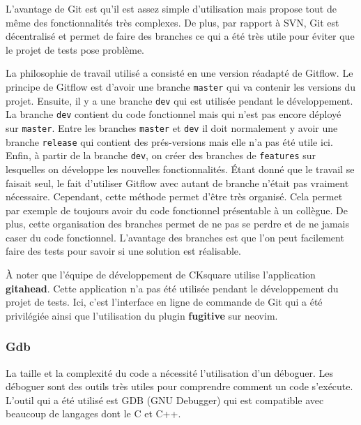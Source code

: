 \documentclass[a4paper]{article}
\begin{document}
L'avantage de Git est qu'il est assez simple d'utilisation mais propose tout de
même des fonctionnalités très complexes. De plus, par rapport à SVN, Git est
décentralisé et permet de faire des branches ce qui a été très utile pour éviter
que le projet de tests pose problème.

La philosophie de travail utilisé a consisté en une version réadapté de Gitflow.
Le principe de Gitflow est d'avoir une branche \verb|master| qui va
contenir les versions du projet. Ensuite, il y a une branche \verb|dev| qui
est utilisée pendant le développement. La branche \verb|dev| contient du
code fonctionnel mais qui n'est pas encore déployé sur \verb|master|. Entre
les branches \verb|master| et \verb|dev| il doit normalement y avoir
une branche \verb|release| qui contient des prés-versions mais elle n'a pas
été utile ici. Enfin, à partir de la branche \verb|dev|, on créer des
branches de \verb|features| sur lesquelles on développe les nouvelles
fonctionnalités. Étant donné que le travail se faisait seul, le fait d'utiliser
Gitflow avec autant de branche n'était pas vraiment nécessaire. Cependant, cette
méthode permet d'être très organisé. Cela permet par exemple de toujours avoir
du code fonctionnel présentable à un collègue. De plus, cette organisation des
branches permet de ne pas se perdre et de ne jamais caser du code fonctionnel.
L'avantage des branches est que l'on peut facilement faire des tests pour savoir
si une solution est réalisable.

À noter que l'équipe de développement de CKsquare utilise l'application
\textbf{gitahead}. Cette application n'a pas été utilisée pendant le
développement du projet de tests. Ici, c'est l'interface en ligne de commande de Git
qui a été privilégiée ainsi que l'utilisation du plugin \textbf{fugitive} sur
neovim.
\subsubsection{Gdb}%

La taille et la complexité du code a nécessité l'utilisation d'un déboguer. Les
déboguer sont des outils très utiles pour comprendre comment un code
s'exécute. L'outil qui a été utilisé est GDB (GNU Debugger) qui est compatible
avec beaucoup de langages dont le C et C++.
\end{document}
